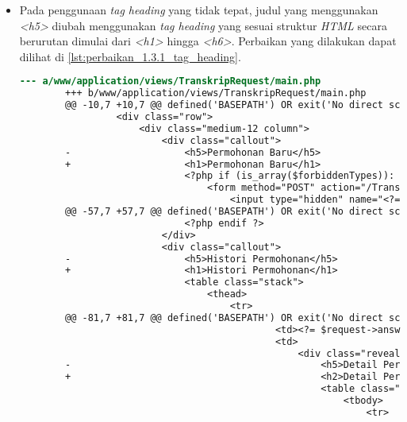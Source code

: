 \begin{itemize}
    \item Pada penggunaan \textit{tag heading} yang tidak tepat, judul yang menggunakan \textit{<h5>} diubah menggunakan \textit{tag heading} yang sesuai struktur \textit{HTML} secara berurutan dimulai dari \textit{<h1>} hingga \textit{<h6>}. Perbaikan yang dilakukan dapat dilihat di \ref{lst:perbaikan_1.3.1_tag_heading}.
    \begin{lstlisting}[frame=single, label={lst:perbaikan_1.3.1_tag_heading}, language=diff, caption=Perbaikan Kriteria Sukses 1.3.1 - Penggunaan \textit{Heading} Tidak Tepat]
        --- a/www/application/views/TranskripRequest/main.php
        +++ b/www/application/views/TranskripRequest/main.php
        @@ -10,7 +10,7 @@ defined('BASEPATH') OR exit('No direct script access allowed');
                 <div class="row">
                     <div class="medium-12 column">
                         <div class="callout">
        -                    <h5>Permohonan Baru</h5>
        +                    <h1>Permohonan Baru</h1>
                             <?php if (is_array($forbiddenTypes)): ?>
                                 <form method="POST" action="/TranskripRequest/add">
                                     <input type="hidden" name="<?= $this->security->get_csrf_token_name() ?>" value="<?= $this->security->get_csrf_hash() ?>" />
        @@ -57,7 +57,7 @@ defined('BASEPATH') OR exit('No direct script access allowed');
                             <?php endif ?>
                         </div>
                         <div class="callout">
        -                    <h5>Histori Permohonan</h5>
        +                    <h1>Histori Permohonan</h1>
                             <table class="stack">
                                 <thead>
                                     <tr>
        @@ -81,7 +81,7 @@ defined('BASEPATH') OR exit('No direct script access allowed');
                                             <td><?= $request->answeredMessage ?></td>
                                             <td>
                                                 <div class="reveal" id="detail<?= $request->id ?>" data-reveal>
        -                                            <h5>Detail Permohonan #<?= $request->id ?></h5>
        +                                            <h2>Detail Permohonan #<?= $request->id ?></h2>
                                                     <table class="stack">
                                                         <tbody>
                                                             <tr>
        

\end{lstlisting}
\end{itemize}
